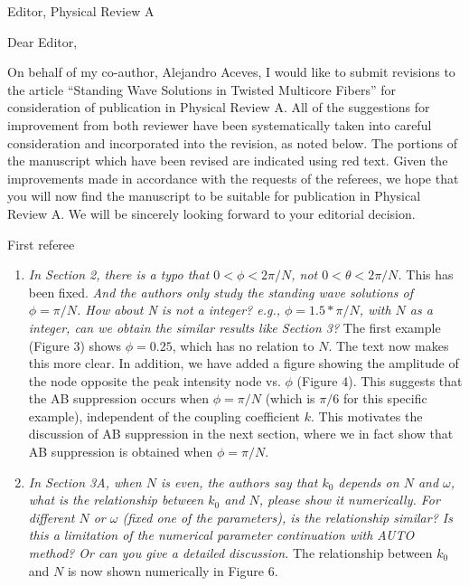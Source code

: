 \documentclass[11pt]{letter}
\begin{document}
\address{Ross Parker \\
Department of Mathematics \\
Southern Methodist University \\
Dallas, TX 75275 \\
\texttt{rhparker@smu.edu}}%
\signature{Ross Parker}
\begin{letter}{Editor, Physical Review A}

\opening{Dear Editor,}

On behalf of my co-author, Alejandro Aceves, I would like to submit revisions to the article ``Standing Wave Solutions in Twisted Multicore Fibers'' for consideration of publication in Physical Review A. All of the suggestions for improvement from both reviewer have been systematically taken into careful consideration and incorporated into the revision, as noted below. The portions of the manuscript which have been revised are indicated using red text. Given the improvements made in accordance with the requests of the referees, we hope that you will now find the manuscript to be suitable for publication in Physical Review A. We will be sincerely looking forward to your editorial decision.

First referee
\begin{enumerate}
\item \emph{In Section 2, there is a typo that $0<\phi<2\pi/N$, not $0<\theta<2\pi/N$.} This has been fixed. \emph{And the authors only study the standing wave solutions of $\phi=\pi/N$. How about N is not a integer? e.g., $\phi=1.5*\pi/N$, with $N$ as a integer, can we obtain the similar results like Section 3?} The first example (Figure 3) shows $\phi = 0.25$, which has no relation to $N$. The text now makes this more clear. In addition, we have added a figure showing the amplitude of the node opposite the peak intensity node vs. $\phi$ (Figure 4). This suggests that the AB suppression occurs when $\phi = \pi/N$ (which is $\pi/6$ for this specific example), independent of the coupling coefficient $k$. This motivates the discussion of AB suppression in the next section, where we in fact show that AB suppression is obtained when $\phi = \pi/N$.

\item \emph{In Section 3A, when $N$ is even, the authors say that $k_0$ depends on $N$ and $\omega$, what is the relationship between $k_0$ and $N$, please show it numerically. For different $N$ or $\omega$ (fixed one of the parameters), is the relationship similar? Is this a limitation of the numerical parameter continuation with AUTO method? Or can you give a detailed discussion.} The relationship between $k_0$ and $N$ is now shown numerically in Figure 6.


\end{enumerate}
\end{letter}
\end{document}
